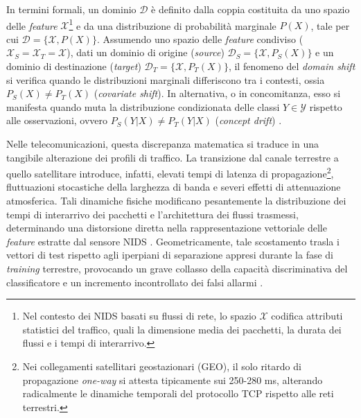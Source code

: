 In termini formali, un dominio $\mathcal{D}$ è definito dalla coppia costituita da uno spazio delle \textit{feature} $\mathcal{X}$\footnote{Nel contesto dei NIDS basati su flussi di rete, lo spazio $\mathcal{X}$ codifica attributi statistici del traffico, quali la dimensione media dei pacchetti, la durata dei flussi e i tempi di interarrivo.} e da una distribuzione di probabilità marginale $P(X)$, tale per cui $\mathcal{D}=\{\mathcal{X},P(X)\}$. 
Assumendo uno spazio delle \textit{feature} condiviso ($\mathcal{X}_S=\mathcal{X}_T=\mathcal{X}$), dati un dominio di origine (\textit{source}) $\mathcal{D}_S=\{\mathcal{X},P_S(X)\}$ e un dominio di destinazione (\textit{target}) $\mathcal{D}_T=\{\mathcal{X},P_T(X)\}$, il fenomeno del \textit{domain shift} si verifica quando le distribuzioni marginali differiscono tra i contesti, ossia $P_S(X)\neq P_T(X)$ (\textit{covariate shift}). 
In alternativa, o in concomitanza, esso si manifesta quando muta la distribuzione condizionata delle classi $Y\in\mathcal{Y}$ rispetto alle osservazioni, ovvero $P_S(Y|X)\neq P_T(Y|X)$ (\textit{concept drift}) \cite{pan2010}.

Nelle telecomunicazioni, questa discrepanza matematica si traduce in una tangibile alterazione dei profili di traffico. 
La transizione dal canale terrestre a quello satellitare introduce, infatti, elevati tempi di latenza di propagazione\footnote{Nei collegamenti satellitari geostazionari (GEO), il solo ritardo di propagazione \textit{one-way} si attesta tipicamente sui 250-280 ms, alterando radicalmente le dinamiche temporali del protocollo TCP rispetto alle reti terrestri.}, fluttuazioni stocastiche della larghezza di banda e severi effetti di attenuazione atmosferica. 
Tali dinamiche fisiche modificano pesantemente la distribuzione dei tempi di interarrivo dei pacchetti e l'architettura dei flussi trasmessi, determinando una distorsione diretta nella rappresentazione vettoriale delle \textit{feature} estratte dal sensore NIDS \cite{kodheli2021, azar2023}. 
Geometricamente, tale scostamento trasla i vettori di test rispetto agli iperpiani di separazione appresi durante la fase di \textit{training} terrestre, provocando un grave collasso della capacità discriminativa del classificatore e un incremento incontrollato dei falsi allarmi \cite{farahani2021}.

